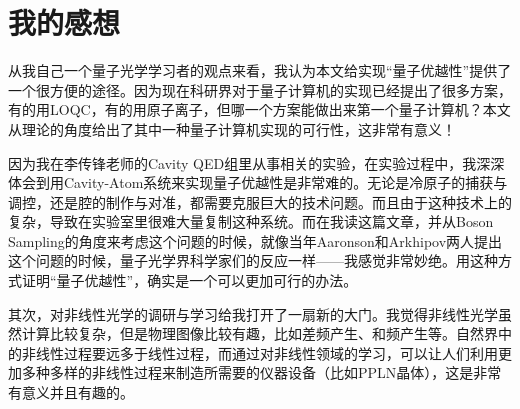 \section{我的感想}

从我自己一个量子光学学习者的观点来看，我认为本文给实现“量子优越性”提供了一个很方便的途径。因为现在科研界对于量子计算机的实现已经提出了很多方案，有的用LOQC，有的用原子离子，但哪一个方案能做出来第一个量子计算机？本文从理论的角度给出了其中一种量子计算机实现的可行性，这非常有意义！

因为我在李传锋老师的Cavity QED组里从事相关的实验，在实验过程中，我深深体会到用Cavity-Atom系统来实现量子优越性是非常难的。无论是冷原子的捕获与调控，还是腔的制作与对准，都需要克服巨大的技术问题。而且由于这种技术上的复杂，导致在实验室里很难大量复制这种系统。而在我读这篇文章，并从Boson Sampling的角度来考虑这个问题的时候，就像当年Aaronson和Arkhipov两人提出这个问题的时候，量子光学界科学家们的反应一样——我感觉非常妙绝。用这种方式证明“量子优越性”，确实是一个可以更加可行的办法。

其次，对非线性光学的调研与学习给我打开了一扇新的大门。我觉得非线性光学虽然计算比较复杂，但是物理图像比较有趣，比如差频产生、和频产生等。自然界中的非线性过程要远多于线性过程，而通过对非线性领域的学习，可以让人们利用更加多种多样的非线性过程来制造所需要的仪器设备（比如PPLN晶体），这是非常有意义并且有趣的。
